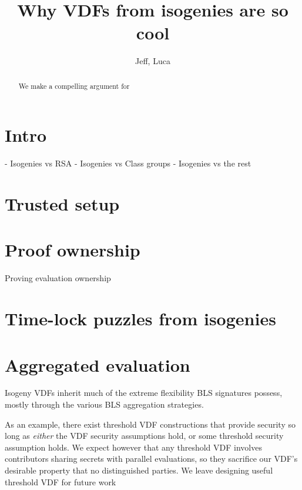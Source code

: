 \documentclass{article}
\title{Why VDFs from isogenies are so cool}
\author{Jeff, Luca}
\date{}
\begin{document}
\maketitle

\begin{abstract}
We make a compelling argument for 
\end{abstract}

\section{Intro}

- Isogenies vs RSA
- Isogenies vs Class groups
- Isogenies vs the rest

\section{Trusted setup}

\section{Proof ownership}


Proving evaluation ownership



\section{Time-lock puzzles from isogenies}


\section{Aggregated evaluation}

Isogeny VDFs inherit much of the extreme flexibility BLS signatures
possess, mostly through the various BLS aggregation strategies.

As an example, there exist threshold VDF constructions that provide
security so long as {\it either} the VDF security assumptions hold,
{\ir or} some threshold security assumption holds.  We expect however
that any threshold VDF involves contributors sharing secrets with
parallel evaluations, so they sacrifice our VDF's desirable property
that no distinguished parties.  We leave designing useful threshold VDF
for future work
\end{document}
